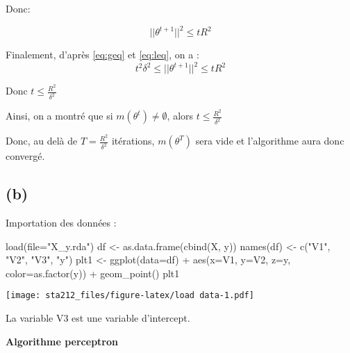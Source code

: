 \documentclass[
]{article}
\newenvironment{Shaded}{\begin{snugshade}}{\end{snugshade}}
\newcommand{\AttributeTok}[1]{\textcolor[rgb]{0.77,0.63,0.00}{#1}}
\newcommand{\FunctionTok}[1]{\textcolor[rgb]{0.00,0.00,0.00}{#1}}
\newcommand{\NormalTok}[1]{#1}
\newcommand{\OtherTok}[1]{\textcolor[rgb]{0.56,0.35,0.01}{#1}}
\newcommand{\SpecialCharTok}[1]{\textcolor[rgb]{0.00,0.00,0.00}{#1}}
\newcommand{\StringTok}[1]{\textcolor[rgb]{0.31,0.60,0.02}{#1}}
\begin{document}
Donc:

\begin{equation} \label{eq:leq}
  \boxed{||\theta^{t+1}||^2  \leq t R^2}
\end{equation}

Finalement, d'après \ref{eq:geq} et \ref{eq:leq}, on a : \[
t^2\delta^2 \leq ||\theta^{t+1}||^2  \leq t R^2
\]

Donc \(\boxed{t \leq \frac{R^2}{\delta^2}}\)

Ainsi, on a montré que si \(m(\theta^t) \neq \emptyset\), alors
\(t \leq \frac{R^2}{\delta^2}\)

Donc, au delà de \(T=\frac{R^2}{\delta^2}\) itérations, \(m(\theta^T)\)
sera vide et l'algorithme aura donc convergé.

\hypertarget{b-2}{%
\subsection{(b)}\label{b-2}}

Importation des données :

\begin{Shaded}
\begin{Highlighting}[]
\FunctionTok{load}\NormalTok{(}\AttributeTok{file=}\StringTok{"X\_y.rda"}\NormalTok{)}
\NormalTok{df }\OtherTok{\textless{}{-}} \FunctionTok{as.data.frame}\NormalTok{(}\FunctionTok{cbind}\NormalTok{(X, y))}
\FunctionTok{names}\NormalTok{(df) }\OtherTok{\textless{}{-}} \FunctionTok{c}\NormalTok{(}\StringTok{"V1"}\NormalTok{, }\StringTok{"V2"}\NormalTok{, }\StringTok{"V3"}\NormalTok{, }\StringTok{"y"}\NormalTok{)}
\NormalTok{plt1 }\OtherTok{\textless{}{-}} \FunctionTok{ggplot}\NormalTok{(}\AttributeTok{data=}\NormalTok{df) }\SpecialCharTok{+} \FunctionTok{aes}\NormalTok{(}\AttributeTok{x=}\NormalTok{V1, }\AttributeTok{y=}\NormalTok{V2, }\AttributeTok{z=}\NormalTok{y, }\AttributeTok{color=}\FunctionTok{as.factor}\NormalTok{(y)) }\SpecialCharTok{+} \FunctionTok{geom\_point}\NormalTok{()}
\NormalTok{plt1}
\end{Highlighting}
\end{Shaded}

\texttt{[image: sta212\_files/figure-latex/load data-1.pdf]}

La variable V3 est une variable d'intercept.

\textbf{Algorithme perceptron}
\end{document}

